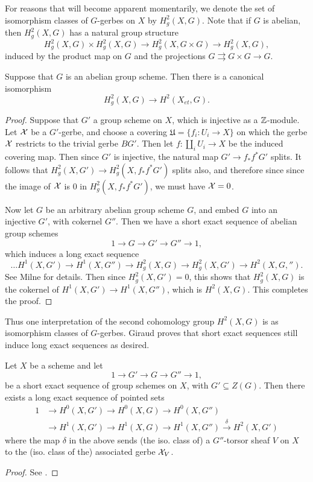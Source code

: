 For reasons that will become apparent momentarily, we denote the set of isomorphism classes of $G$-gerbes on $X$ by $H^2_g(X,G)$.  Note that if $G$ is abelian, then $H^2_g(X,G)$ has a natural group structure
$$H_g^2(X,G)\times H_g^2(X,G)\rightarrow H_g^2(X,G\times G)\rightarrow H_g^2(X,G),$$
induced by the product map on $G$ and the projections $G\rightrightarrows G\times G\rightarrow G$.
\begin{prop}
Suppose that $G$ is an abelian group scheme.  Then there is a canonical isomorphism
$$H^2_g(X,G)\rightarrow H^2(X_{et},G).$$
\end{prop}
\begin{proof}
Suppose that $G'$ a group scheme on $X$, which is injective as a $\mathbb{Z}$-module.  Let $\mathcal{X}$ be a $G'$-gerbe, and choose a covering $\mathfrak U=\{f_i: U_i\rightarrow X\}$ on which the gerbe $\mathcal{X}$ restricts to the trivial gerbe $BG'$.  Then let $f: \amalg_i U_i\rightarrow X$ be the induced covering map.  Then since $G'$ is injective, the natural map $G'\rightarrow f_*f^*G'$ splits.  It follows that $H^2_g(X,G')\rightarrow H^2_g(X,f_*f^*G')$ splits also, and therefore since since the image of $\mathcal{X}$ is $0$ in $H^2_g(X,f_*f^*G')$, we must have $\mathcal{X} = 0$.

Now let $G$ be an arbitrary abelian group scheme $G$, and embed $G$ into an injective $G'$, with cokernel $G''$.  Then we have a short exact sequence of abelian group schemes
$$1\rightarrow G\rightarrow G'\rightarrow G''\rightarrow 1,$$
which induces a long exact sequence
$$\dots H^1(X,G')\rightarrow H^1(X,G'')\rightarrow H^2_g(X,G)\rightarrow H^2_g(X,G')\rightarrow H^2(X,G,'').$$
See Milne \cite{milne1980etale} for details.  Then since $H^2_g(X,G') = 0$, this shows that $H^2_g(X,G)$ is the cokernel of $H^1(X,G')\rightarrow H^1(X,G'')$, which is $H^2(X,G)$.  This completes the proof.
\end{proof}

Thus one interpretation of the second cohomology group $H^2(X,G)$ is as isomorphism classes of $G$-gerbes.  Giraud proves that short exact sequences still induce long exact sequences as desired.
\begin{lem}[Giraud]\label{giraurds lemma}
Let $X$ be a scheme and let
$$1\rightarrow G'\rightarrow G\rightarrow G''\rightarrow 1,$$
be a short exact sequence of group schemes on $X$, with $G'\subseteq Z(G)$.  Then there exists a long exact sequence of pointed sets
\begin{align*}
1 & \rightarrow H^0(X,G') \rightarrow H^0(X,G)\rightarrow H^0(X,G'')\\
  & \rightarrow H^1(X,G') \rightarrow H^1(X,G)\rightarrow H^1(X,G'')\xrightarrow{\delta} H^2(X,G')
\end{align*}
where the map $\delta$ in the above sends (the iso. class of) a $G''$-torsor sheaf $V$ on $X$ to the (iso. class of the) associated gerbe $\mathcal{X}_V$.
\end{lem}
\begin{proof}
See \cite{giraud1971cohomologie}.
\end{proof}


